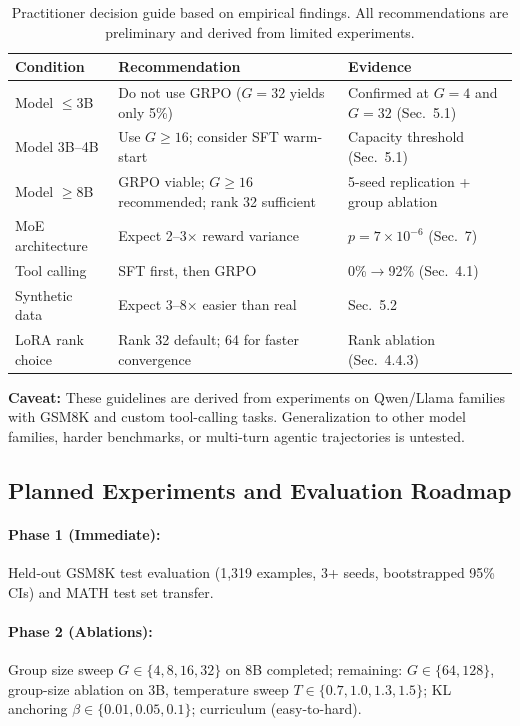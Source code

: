 \documentclass{article}
\begin{document}
\begin{table}[htbp]
    \centering
    \footnotesize
    \caption{Practitioner decision guide based on empirical findings. All recommendations are preliminary and derived from limited experiments.}
    \begin{tabular}{lll}
        \toprule
        Condition & Recommendation & Evidence \\
        \midrule
        Model $\leq$3B & Do not use GRPO ($G{=}32$ yields only 5\%) & Confirmed at $G{=}4$ and $G{=}32$ (Sec.~5.1) \\
        Model 3B--4B & Use $G \geq 16$; consider SFT warm-start & Capacity threshold (Sec.~5.1) \\
        Model $\geq$8B & GRPO viable; $G \geq 16$ recommended; rank 32 sufficient & 5-seed replication + group ablation \\
        MoE architecture & Expect 2--3$\times$ reward variance & $p{=}7{\times}10^{-6}$ (Sec.~7) \\
        Tool calling & SFT first, then GRPO & 0\%$\rightarrow$92\% (Sec.~4.1) \\
        Synthetic data & Expect 3--8$\times$ easier than real & Sec.~5.2 \\
        LoRA rank choice & Rank 32 default; 64 for faster convergence & Rank ablation (Sec.~4.4.3) \\
        \bottomrule
    \end{tabular}
    \label{tab:practitioner}
\end{table}

\textbf{Caveat:} These guidelines are derived from experiments on Qwen/Llama families with GSM8K and custom tool-calling tasks. Generalization to other model families, harder benchmarks, or multi-turn agentic trajectories is untested.

\subsection{Planned Experiments and Evaluation Roadmap}

\paragraph{Phase 1 (Immediate):} Held-out GSM8K test evaluation (1,319 examples, 3+ seeds, bootstrapped 95\% CIs) and MATH test set transfer.

\paragraph{Phase 2 (Ablations):} Group size sweep $G \in \{4, 8, 16, 32\}$ on 8B completed; remaining: $G \in \{64, 128\}$, group-size ablation on 3B, temperature sweep $T \in \{0.7, 1.0, 1.3, 1.5\}$; KL anchoring $\beta \in \{0.01, 0.05, 0.1\}$; curriculum (easy-to-hard).
\end{document}
